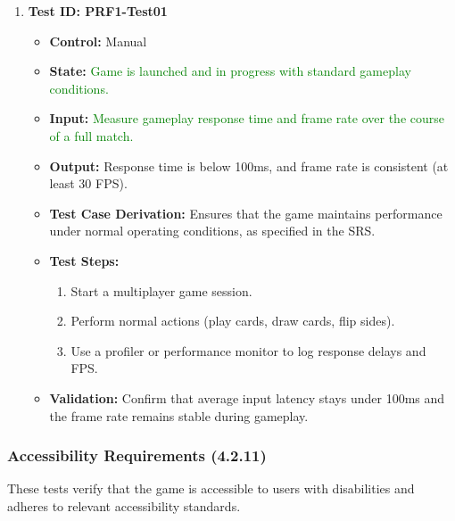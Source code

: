 \documentclass[12pt]{article}
\newcommand{\added}[1]{\textcolor{green}{#1}}
\begin{document}
\begin{enumerate}
    \item \textbf{Test ID: PRF1-Test01}
    \begin{itemize}
        \item \textbf{Control:} Manual
        \item \textbf{State:} \added{Game is launched and in progress with standard gameplay conditions.}
        \item \textbf{Input:} \added{Measure gameplay response time and frame rate over the course of a full match.}
        \item \textbf{Output:} Response time is below 100ms, and frame rate is consistent (at least 30 FPS).
        \item \textbf{Test Case Derivation:} Ensures that the game maintains performance under normal operating conditions, as specified in the SRS.
        \item \textbf{Test Steps:}
        \begin{enumerate}
            \item Start a multiplayer game session.
            \item Perform normal actions (play cards, draw cards, flip sides).
            \item Use a profiler or performance monitor to log response delays and FPS.
        \end{enumerate}
        \item \textbf{Validation:} Confirm that average input latency stays under 100ms and the frame rate remains stable during gameplay.
    \end{itemize}
\end{enumerate}

\subsubsection{Accessibility Requirements (4.2.11)}

These tests verify that the game is accessible to users with disabilities and adheres to relevant accessibility standards.
\end{document}
